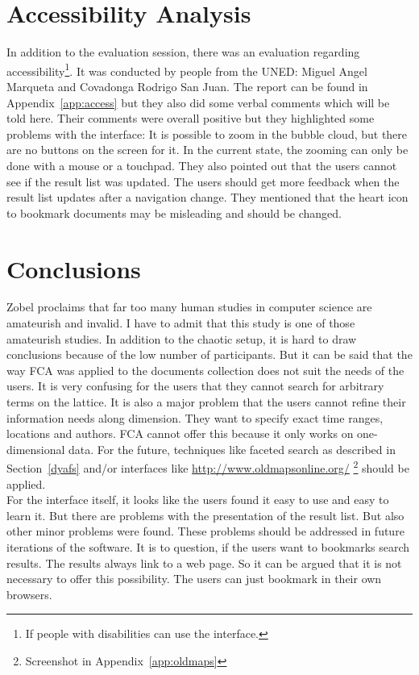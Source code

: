 \documentclass[11pt]{report}
\begin{document}
\section{Accessibility Analysis}

In addition to the evaluation session, there was an evaluation regarding accessibility\footnote{If people with disabilities can use the interface.}. It was conducted by people from the UNED: Miguel Angel Marqueta and Covadonga Rodrigo San Juan. The report can be found in Appendix~\ref{app:access} but they also did some verbal comments which will be told here. Their comments were overall positive but they highlighted some problems with the interface: It is possible to zoom in the bubble cloud, but there are no buttons on the screen for it. In the current state, the zooming can only be done with a mouse or a touchpad. They also pointed out that the users cannot see if the result list was updated. The users should get more feedback when the result list updates after a navigation change. They mentioned that the heart icon to bookmark documents may be misleading and should be changed. 

\section{Conclusions} 
Zobel \cite{Zobel2004} proclaims that far too many human studies in computer science are amateurish and invalid. I have to admit that this study is one of those amateurish studies. In addition to the chaotic setup, it is hard to draw conclusions because of the low number of participants. But it can be said that the way FCA was applied to the documents collection does not suit the needs of the users. It is very confusing for the users that they cannot search for arbitrary terms on the lattice. It is also a major problem that the users cannot refine their information needs along dimension. They want to specify exact time ranges, locations and authors. FCA cannot offer this because it only works on one-dimensional data. For the future, techniques like faceted search as described in Section~\ref{dyafs} and/or interfaces like \url{http://www.oldmapsonline.org/} \footnote{Screenshot in Appendix~\ref{app:oldmaps}} should be applied.\\
 
For the interface itself, it looks like the users found it easy to use and easy to learn it. But there are problems with the presentation of the result list. But also other minor problems were found. These problems should be addressed in future iterations of the software. It is to question, if the users want to bookmarks search results. The results always link to a web page. So it can be argued that it is not necessary to offer this possibility. The users can just bookmark in their own browsers.
\end{document}
